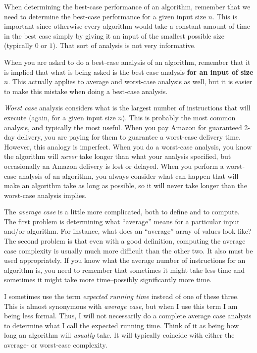 When determining the best-case performance of an algorithm, remember that we need
to determine the best-case performance for a given input size $n$.  This is important
since otherwise every algorithm would take a constant amount of time in the best case simply by giving it an input of the smallest possible size (typically $0$ or $1$).  That sort of
analysis is not very informative.

\begin{rem}
When you are asked to do a best-case analysis of an algorithm, remember that it is
implied that what is being asked is the best-case analysis {\bf for an input of size $n$}.
This actually applies to average and worst-case analysis as well, but it is easier to
make this mistake when doing a best-case analysis.
\end{rem}

{\em Worst case} analysis considers what is the largest number of instructions that will execute
(again, for a given input size $n$). 
This is probably the most common analysis, and typically the most useful.  
When you pay Amazon for guaranteed
2-day delivery, you are paying for them to guarantee a worst-case delivery time.  
However, this analogy is imperfect.  
When you do a worst-case analysis, you know the algorithm will {\em never} take longer
than what your analysis specified, but occasionally an Amazon delivery is lost or delayed.
When you perform a worst-case analysis of an algorithm, you always consider what can happen
that will make an algorithm take as long as possible, so it will never take longer than the worst-case analysis implies.
 
The {\em average case} is a little more complicated, both to define and to compute.  
The first problem is determining what ``average'' means for a particular input and/or algorithm.  
For instance, what does an ``average'' array of values look like?
The second problem is that even with a good definition, computing the average case
complexity is usually much more difficult than the other two.
It also must be used appropriately.  
If you know what the average number of instructions for an algorithm is, 
you need to remember that sometimes it might take less time and 
sometimes it might take more time--possibly significantly more time.

I sometimes use the term {\em expected running time} instead of one of these three.
This is almost synonymous with {\em average case}, 
but when I use this term I am being less formal.  
Thus, I will not necessarily do a complete
average case analysis to determine what I call the expected running time.  
Think of it as being how long an algorithm will {\em usually} take.  It will typically
coincide with either the average- or worst-case complexity.

